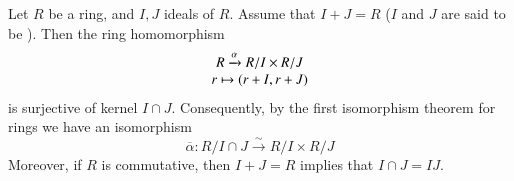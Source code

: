 \documentclass[12pt, a4paper, oneside, openright, titlepage]{book}
\begin{document}
\begin{namthm}
    Let $R$ be a ring, and $I,J$ ideals of $R$. Assume that $I + J = R$ ($I$ and $J$ are said to be ). Then the ring homomorphism \begin{equation}
        \begin{array}{c} R\xrightarrow{\alpha} R/I \times R/J \\ r \mapsto (r+I, r+J) \end{array}
    \end{equation}
    is surjective of kernel $I \cap J$. Consequently, by the first isomorphism theorem for rings we have an isomorphism \begin{equation}
        \overline{\alpha}: R/I\cap J \xrightarrow{\sim} R/I \times R/J
    \end{equation}
    Moreover, if $R$ is commutative, then $I+J = R$ implies that $I \cap J = IJ$.
\end{namthm}
\end{document}
